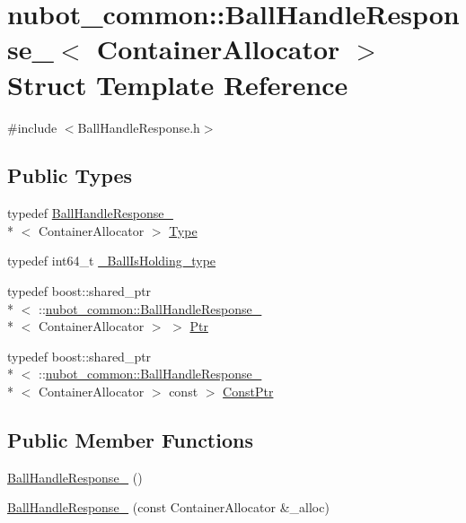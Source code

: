 \hypertarget{structnubot__common_1_1BallHandleResponse__}{\section{nubot\-\_\-common\-:\-:Ball\-Handle\-Response\-\_\-$<$ Container\-Allocator $>$ Struct Template Reference}
\label{structnubot__common_1_1BallHandleResponse__}
}


{\ttfamily \#include $<$Ball\-Handle\-Response.\-h$>$}

\subsection*{Public Types}
\begin{DoxyCompactItemize}
\item 
typedef \hyperlink{structnubot__common_1_1BallHandleResponse__}{Ball\-Handle\-Response\-\_\-}\\*
$<$ Container\-Allocator $>$ \hyperlink{structnubot__common_1_1BallHandleResponse___ae42df3848bb38ecbed216ed1efa93149}{Type}
\item 
typedef int64\-\_\-t \hyperlink{structnubot__common_1_1BallHandleResponse___a35b16dc16cbb5dcae7abe8d9212b86bf}{\-\_\-\-Ball\-Is\-Holding\-\_\-type}
\item 
typedef boost\-::shared\-\_\-ptr\\*
$<$ \-::\hyperlink{structnubot__common_1_1BallHandleResponse__}{nubot\-\_\-common\-::\-Ball\-Handle\-Response\-\_\-}\\*
$<$ Container\-Allocator $>$ $>$ \hyperlink{structnubot__common_1_1BallHandleResponse___a26914838e95874f3bedfa843d65f0d22}{Ptr}
\item 
typedef boost\-::shared\-\_\-ptr\\*
$<$ \-::\hyperlink{structnubot__common_1_1BallHandleResponse__}{nubot\-\_\-common\-::\-Ball\-Handle\-Response\-\_\-}\\*
$<$ Container\-Allocator $>$ const  $>$ \hyperlink{structnubot__common_1_1BallHandleResponse___a4f766babaf9b776e70c34ba0f69bbd52}{Const\-Ptr}
\end{DoxyCompactItemize}
\subsection*{Public Member Functions}
\begin{DoxyCompactItemize}
\item 
\hyperlink{structnubot__common_1_1BallHandleResponse___a3f5ac1e7f523d88ec4df7a640dacbbcd}{Ball\-Handle\-Response\-\_\-} ()
\item 
\hyperlink{structnubot__common_1_1BallHandleResponse___ae273c16e83efd91fb4fabf77083be483}{Ball\-Handle\-Response\-\_\-} (const Container\-Allocator \&\-\_\-alloc)
\end{DoxyCompactItemize}
